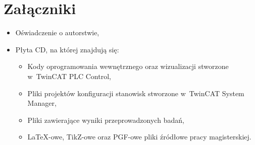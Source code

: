 \section{Załączniki}
\begin{itemize}
\item Oświadczenie o autorstwie,
\item Płyta CD, na której znajdują się:
\begin{itemize}
\item Kody oprogramowania wewnętrznego oraz wizualizacji stworzone w~TwinCAT PLC Control,
\item Pliki projektów konfiguracji stanowisk stworzone w~TwinCAT System Manager,
\item Pliki zawierające wyniki przeprowadzonych badań,
\item \LaTeX-owe, TikZ-owe oraz PGF-owe  pliki źródłowe pracy magisterskiej.
\end{itemize}
\end{itemize}
